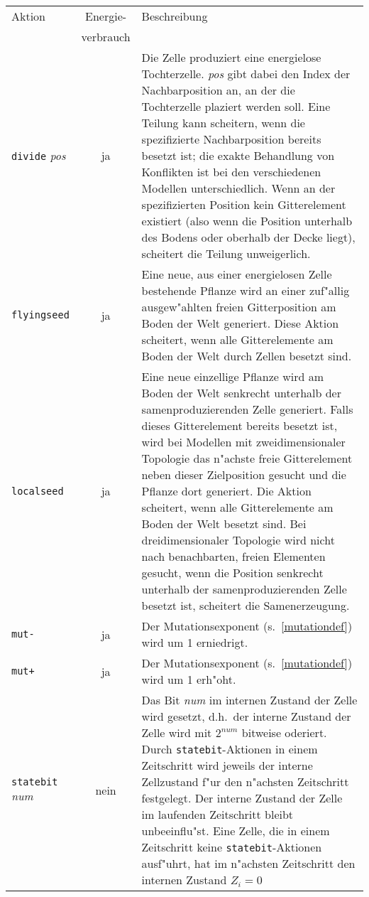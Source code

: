 \label{cellactionlist}
\medskip
\noindent\begin{tabularx}{\linewidth}{l|c|X}
Aktion & Energie- & Beschreibung \\
       & verbrauch & \\ \hline \hline
\verb|divide| {\slshape pos} & ja &  Die Zelle produziert eine energielose
    Tochterzelle. {\slshape pos} gibt dabei den Index der Nachbarposition an,
    an der die Tochterzelle plaziert werden soll. Eine Teilung kann scheitern,
    wenn die spezifizierte Nachbarposition bereits besetzt ist; die exakte Behandlung
    von Konflikten ist bei den verschiedenen Modellen unterschiedlich. Wenn
    an der spezifizierten Position kein Gitterelement existiert (also wenn
    die Position unterhalb des Bodens oder oberhalb der Decke liegt), scheitert
    die Teilung unweigerlich. \\ \hline
\verb|flyingseed| & ja & Eine neue, aus einer energielosen Zelle bestehende
    Pflanze wird an einer zuf"allig ausgew"ahlten freien Gitterposition am
    Boden der Welt generiert. Diese Aktion scheitert,
    wenn alle Gitterelemente am Boden der Welt durch Zellen besetzt sind. \\ \hline
\verb|localseed| & ja & Eine neue einzellige Pflanze wird am Boden der
    Welt senkrecht unterhalb der samenproduzierenden Zelle generiert. Falls
    dieses Gitterelement bereits besetzt ist, wird bei Modellen mit zweidimensionaler
    Topologie das n"achste freie Gitterelement neben dieser Zielposition gesucht
    und die Pflanze dort generiert. Die Aktion scheitert, wenn alle Gitterelemente
    am Boden der Welt besetzt sind. Bei dreidimensionaler Topologie wird nicht
    nach benachbarten, freien Elementen gesucht, wenn die Position senkrecht unterhalb
    der samenproduzierenden Zelle besetzt ist, scheitert die Samenerzeugung. \\ \hline
\verb|mut-| & ja &  Der Mutationsexponent (s.\ \ref{mutationdef}) wird
    um 1 erniedrigt. \\ \hline
\verb|mut+| & ja & Der Mutationsexponent (s.\ \ref{mutationdef}) wird
    um 1 erh"oht. \\ \hline
\verb|statebit| {\slshape num} & nein & Das Bit {\slshape num} im internen
    Zustand der Zelle wird gesetzt, d.h.\ der interne Zustand der Zelle wird
    mit $2^{\mathit{num}}$ bitweise oderiert. Durch \verb|statebit|-Aktionen
    in einem Zeitschritt wird jeweils der interne Zellzustand f"ur den n"achsten
    Zeitschritt festgelegt. Der interne Zustand der Zelle im laufenden
    Zeitschritt bleibt unbeeinflu"st. Eine Zelle, die in einem Zeitschritt keine
    \verb|statebit|-Aktionen ausf"uhrt, hat im n"achsten Zeitschritt den internen
    Zustand $Z_i=0$ \\
\end{tabularx}
\medskip

